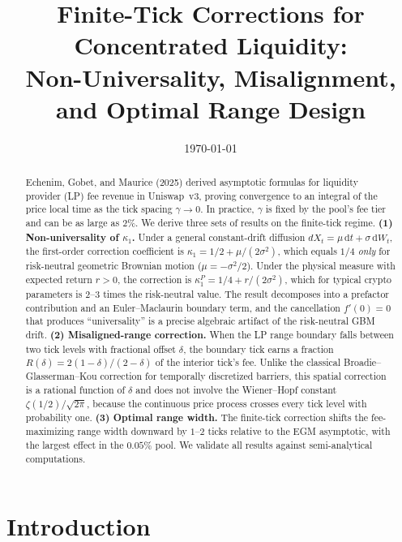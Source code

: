 \documentclass[11pt]{article}
\title{Finite-Tick Corrections for Concentrated Liquidity:\\
Non-Universality, Misalignment, and Optimal Range Design}
\author{}
\date{\today}
\theoremstyle{definition}
\theoremstyle{remark}
\newcommand{\dd}{\,\mathrm{d}}
\begin{document}
\maketitle

\begin{abstract}
Echenim, Gobet, and Maurice (2025) derived asymptotic formulas for
liquidity provider (LP) fee revenue in Uniswap~v3, proving convergence
to an integral of the price local time as the tick spacing
$\gamma \to 0$. In practice, $\gamma$ is fixed by the pool's fee tier
and can be as large as $2\%$. We derive three sets of results on the
finite-tick regime. \textbf{(1) Non-universality of $\kappa_1$.} Under a
general constant-drift diffusion $dX_t = \mu\dd t + \sigma\dd W_t$, the
first-order correction coefficient is $\kappa_1 = 1/2 + \mu/(2\sigma^2)$,
which equals $1/4$ \emph{only} for risk-neutral geometric Brownian
motion ($\mu = -\sigma^2/2$). Under the physical measure with expected
return $r > 0$, the correction is $\kappa_1^P = 1/4 + r/(2\sigma^2)$,
which for typical crypto parameters is $2$--$3$ times the risk-neutral
value. The result decomposes into a prefactor contribution and an
Euler--Maclaurin boundary term, and the cancellation $f'(0) = 0$ that
produces ``universality'' is a precise algebraic artifact of the
risk-neutral GBM drift. \textbf{(2) Misaligned-range correction.} When
the LP range boundary falls between two tick levels with fractional
offset $\delta$, the boundary tick earns a fraction
$R(\delta) = 2(1-\delta)/(2-\delta)$ of the interior tick's fee. Unlike
the classical Broadie--Glasserman--Kou correction for temporally
discretized barriers, this spatial correction is a rational function of
$\delta$ and does not involve the Wiener--Hopf constant
$\zeta(1/2)/\sqrt{2\pi}$, because the continuous price process crosses
every tick level with probability one. \textbf{(3) Optimal range width.}
The finite-tick correction shifts the fee-maximizing range width downward
by $1$--$2$ ticks relative to the EGM asymptotic, with the largest
effect in the $0.05\%$ pool. We validate all results against
semi-analytical computations.
\end{abstract}

\section{Introduction}\label{sec:intro}

\end{document}

